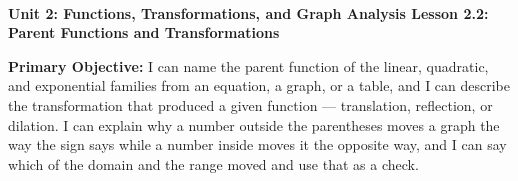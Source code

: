 \documentclass[10pt]{article}
\newcommand{\UnitNumberName}{Unit 2: Functions, Transformations, and Graph Analysis \quad}
\newcommand{\LessonNumberName}{Lesson 2.2: Parent Functions and Transformations}
\begin{document}
\begin{center}
    {\Large\bfseries \CourseName \\
    {\small\bfseries \UnitNumberName \LessonNumberName}}
\end{center}

\begin{tcolorbox}[colback=mist, colframe=royal, boxrule=0.9pt, arc=2mm,
    left=2mm, right=2mm, top=1.5mm, bottom=1.5mm]
    \textbf{Primary Objective:} I can name the parent function of the linear, quadratic, and
    exponential families from an equation, a graph, or a table, and I can describe the
    transformation that produced a given function --- translation, reflection, or dilation. I can
    explain why a number outside the parentheses moves a graph the way the sign says while a number
    inside moves it the opposite way, and I can say which of the domain and the range moved and use
    that as a check.
\end{tcolorbox}
\end{document}

